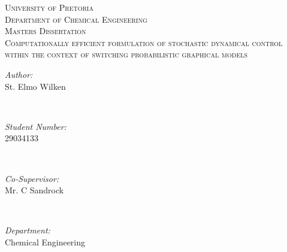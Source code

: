 \begin{titlepage}

\center %
 

\textsc{\LARGE University of Pretoria}\\[1.5cm] %
\textsc{\Large Department of Chemical Engineering}\\[0.5cm] %
\textsc{\large Masters Dissertation}\\[3.5cm] %



\huge \textsc{Computationally efficient formulation of stochastic dynamical control within the context of switching probabilistic graphical models} \\[3.5cm]
 

\begin{minipage}{0.4\textwidth}
\begin{flushleft} \large
\emph{Author:}\\
St. Elmo Wilken %
\end{flushleft}
\end{minipage}
~
\begin{minipage}{0.4\textwidth}
\begin{flushright} \large
\emph{Student Number:} \\
29034133 
\end{flushright}
\end{minipage}\\[2cm]

\begin{minipage}{0.4\textwidth}
\begin{flushleft} \large
\emph{Co-Supervisor:}\\
Mr. C Sandrock %
\end{flushleft}
\end{minipage}
~
\begin{minipage}{0.4\textwidth}
\begin{flushright} \large
\emph{Department:} \\
Chemical Engineering
\end{flushright}
\end{minipage}\\[2cm]


\end{titlepage}
